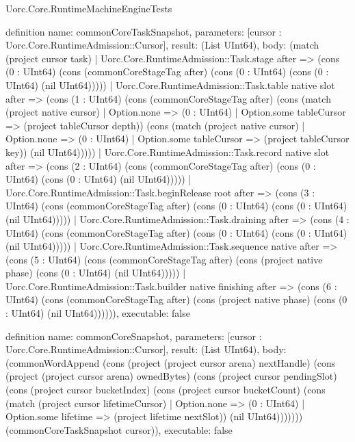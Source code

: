 \begin{lexlean}{Uorc.Core.RuntimeMachineEngineTests}
\begin{semanticmodule}
definition{
  name: commonCoreTaskSnapshot,
  parameters: [cursor : Uorc.Core.RuntimeAdmission::Cursor],
  result: (List UInt64),
  body: (match (project cursor task)
    | Uorc.Core.RuntimeAdmission::Task.stage after => (cons (0 : UInt64) (cons (commonCoreStageTag after) (cons (0 : UInt64) (cons (0 : UInt64) (nil UInt64)))))
    | Uorc.Core.RuntimeAdmission::Task.table native slot after => (cons (1 : UInt64) (cons (commonCoreStageTag after) (cons (match (project native cursor)
      | Option.none => (0 : UInt64)
      | Option.some tableCursor => (project tableCursor depth)) (cons (match (project native cursor)
      | Option.none => (0 : UInt64)
      | Option.some tableCursor => (project tableCursor key)) (nil UInt64)))))
    | Uorc.Core.RuntimeAdmission::Task.record native slot after => (cons (2 : UInt64) (cons (commonCoreStageTag after) (cons (0 : UInt64) (cons (0 : UInt64) (nil UInt64)))))
    | Uorc.Core.RuntimeAdmission::Task.beginRelease root after => (cons (3 : UInt64) (cons (commonCoreStageTag after) (cons (0 : UInt64) (cons (0 : UInt64) (nil UInt64)))))
    | Uorc.Core.RuntimeAdmission::Task.draining after => (cons (4 : UInt64) (cons (commonCoreStageTag after) (cons (0 : UInt64) (cons (0 : UInt64) (nil UInt64)))))
    | Uorc.Core.RuntimeAdmission::Task.sequence native after => (cons (5 : UInt64) (cons (commonCoreStageTag after) (cons (project native phase) (cons (0 : UInt64) (nil UInt64)))))
    | Uorc.Core.RuntimeAdmission::Task.builder native finishing after => (cons (6 : UInt64) (cons (commonCoreStageTag after) (cons (project native phase) (cons (0 : UInt64) (nil UInt64)))))),
  executable: false
}

definition{
  name: commonCoreSnapshot,
  parameters: [cursor : Uorc.Core.RuntimeAdmission::Cursor],
  result: (List UInt64),
  body: (commonWordAppend (cons (project (project cursor arena) nextHandle) (cons (project (project cursor arena) ownedBytes) (cons (project cursor pendingSlot) (cons (project cursor bucketIndex) (cons (project cursor bucketCount) (cons (match (project cursor lifetimeCursor)
    | Option.none => (0 : UInt64)
    | Option.some lifetime => (project lifetime nextSlot)) (nil UInt64))))))) (commonCoreTaskSnapshot cursor)),
  executable: false
}


\end{semanticmodule}
\end{lexlean}
